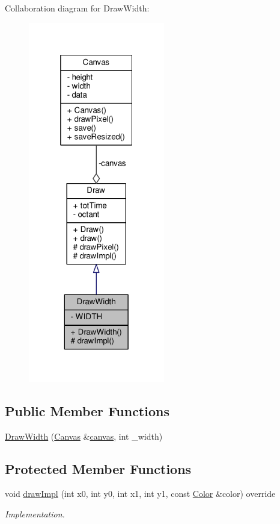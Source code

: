Collaboration diagram for Draw\+Width\+:
\nopagebreak
\begin{figure}[H]
\begin{center}
\leavevmode
\includegraphics[width=169pt]{classDrawWidth__coll__graph}
\end{center}
\end{figure}
\subsection*{Public Member Functions}
\begin{DoxyCompactItemize}
\item 
\hyperlink{classDrawWidth_af073f8b445c1411582a6f2c2027ec8bd}{Draw\+Width} (\hyperlink{classCanvas}{Canvas} \&\hyperlink{classDraw_a72ed77716d9eb7068414f0e4e00753bd}{canvas}, int \+\_\+width)
\end{DoxyCompactItemize}
\subsection*{Protected Member Functions}
\begin{DoxyCompactItemize}
\item 
void \hyperlink{classDrawWidth_a566f96378bc924c2362551c062612131}{draw\+Impl} (int x0, int y0, int x1, int y1, const \hyperlink{canvas_8h_a084a39206618848fb8bc9187d3758c87}{Color} \&color) override
\begin{DoxyCompactList}\small\item\em Implementation. \end{DoxyCompactList}\end{DoxyCompactItemize}
